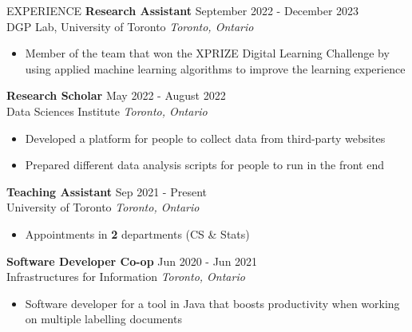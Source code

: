 \documentclass{resume} %
\begin{document}
\begin{rSection}{EXPERIENCE}
    \textbf{Research Assistant} \hfill September 2022 - December 2023\\DGP Lab, University of Toronto \hfill \textit{Toronto, Ontario}
    \begin{itemize}
        \itemsep -3pt {} 
        \item Member of the team that won the XPRIZE Digital Learning Challenge by using applied machine learning algorithms to improve the learning experience
    \end{itemize}

    \textbf{Research Scholar} \hfill May 2022 - August 2022\\Data Sciences Institute \hfill \textit{Toronto, Ontario}
    \begin{itemize}
        \itemsep -3pt {} 
        \item Developed a platform for people to collect data from third-party websites
        \item Prepared different data analysis scripts for people to run in the front end
    \end{itemize}

 
    \textbf{Teaching Assistant} \hfill Sep 2021 - Present\\University of Toronto \hfill \textit{Toronto, Ontario}
    \begin{itemize}
        \itemsep -3pt {} 
        \item Appointments in \textbf{2} departments (CS \& Stats)
    \end{itemize}
    
    \textbf{Software Developer Co-op} \hfill Jun 2020 - Jun 2021\\Infrastructures for Information \hfill \textit{Toronto, Ontario}
    \begin{itemize}
        \itemsep -3pt {} 
        \item Software developer for a tool in Java that boosts productivity when working on multiple labelling documents
    \end{itemize}

\end{rSection} 

\end{document}
